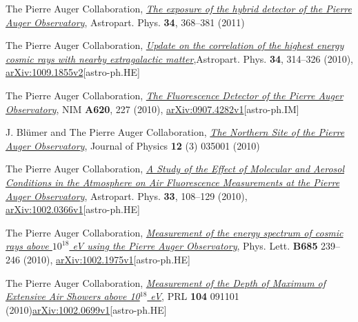 \begin{etaremune}
\item {}The Pierre Auger Collaboration,
\href{http://dx.doi.org/10.1016/j.astropartphys.2010.10.001}{\emph{The exposure
of the hybrid detector of the Pierre Auger Observatory}}, Astropart. Phys. {\bf
34}, 368--381 (2011)

\item {}The Pierre Auger Collaboration,
\href{http://dx.doi.org/10.1016/j.astropartphys.2010.08.010}{\emph{Update on
the correlation of the highest energy cosmic rays with nearby extragalactic
matter}},Astropart. Phys. {\bf 34}, 314--326 (2010),
\href{http://arxiv.org/abs/1009.1855}{arXiv:1009.1855v2}[astro-ph.HE]

\item {}The Pierre Auger Collaboration,
\href{http://dx.doi.org/10.1016/j.nima.2010.04.023}{\emph{The Fluorescence
Detector of the Pierre Auger Observatory}}, NIM {\bf A620}, 227 (2010),
\href{http://arxiv.org/abs/0907.4282}{arXiv:0907.4282v1}[astro-ph.IM]

\item {}J. Bl\"umer and The Pierre Auger Collaboration,
\href{http://dx.doi.org/10.1088/1367-2630/12/3/035001}{\emph{The Northern Site
of the Pierre Auger Observatory}}, Journal of Physics {\bf 12} (3) 035001
(2010)

\item {}The Pierre Auger Collaboration,
\href{http://dx.doi.org/10.1016/j.astropartphys.2009.12.005}{\emph{A Study of
the Effect of Molecular and Aerosol Conditions in the Atmosphere on Air
Fluorescence Measurements at the Pierre Auger Observatory}}, Astropart. Phys.
{\bf 33}, 108--129 (2010),
\href{http://arxiv.org/abs/0907.4282}{arXiv:1002.0366v1}[astro-ph.HE]

\item {}The Pierre Auger Collaboration,
\href{http://dx.doi.org/10.1016/j.physletb.2010.02.013}{\emph{Measurement of
the energy spectrum of cosmic rays above $10^{18}$ eV using the Pierre Auger
Observatory}}, Phys. Lett. {\bf B685} 239--246 (2010),
\href{http://arxiv.org/abs/1002.1975}{arXiv:1002.1975v1}[astro-ph.HE]

\item {}The Pierre Auger Collaboration,
\href{http://dx.doi.org/10.1103/PhysRevLett.104.091101}{\emph{Measurement of
the Depth of Maximum of Extensive Air Showers above 10$^{18}$ eV}}, PRL {\bf
104} 091101
(2010)\href{http://arxiv.org/abs/1002.0699}{arXiv:1002.0699v1}[astro-ph.HE]


\end{etaremune}

